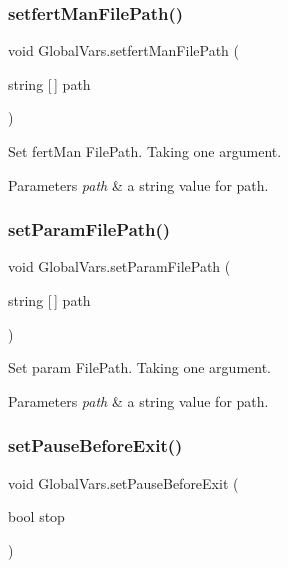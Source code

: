 \subsubsection{\texorpdfstring{setfertManFilePath()}{setfertManFilePath()}}
{\footnotesize\ttfamily void Global\+Vars.\+setfert\+Man\+File\+Path (\begin{DoxyParamCaption}\item[{string \mbox{[}$\,$\mbox{]}}]{path }\end{DoxyParamCaption})\hspace{0.3cm}{\ttfamily [inline]}}



Set fert\+Man File\+Path. Taking one argument. 


\begin{DoxyParams}{Parameters}
{\em path} & a string value for path. \\
\hline
\end{DoxyParams}
\mbox{\label{class_global_vars_a600488f35519b3e549b8160de9fff555}} 
\subsubsection{\texorpdfstring{setParamFilePath()}{setParamFilePath()}}
{\footnotesize\ttfamily void Global\+Vars.\+set\+Param\+File\+Path (\begin{DoxyParamCaption}\item[{string \mbox{[}$\,$\mbox{]}}]{path }\end{DoxyParamCaption})\hspace{0.3cm}{\ttfamily [inline]}}



Set param File\+Path. Taking one argument. 


\begin{DoxyParams}{Parameters}
{\em path} & a string value for path. \\
\hline
\end{DoxyParams}
\mbox{\label{class_global_vars_ac26e11e3695f100eeb3081cd4c0fa3d4}} 
\subsubsection{\texorpdfstring{setPauseBeforeExit()}{setPauseBeforeExit()}}
{\footnotesize\ttfamily void Global\+Vars.\+set\+Pause\+Before\+Exit (\begin{DoxyParamCaption}\item[{bool}]{stop }\end{DoxyParamCaption})\hspace{0.3cm}{\ttfamily [inline]}}




